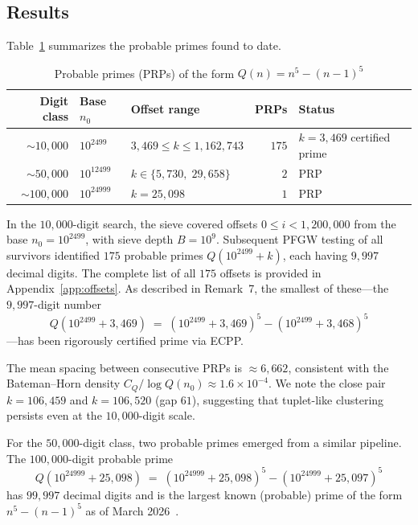 \documentclass[11pt,a4paper]{article}
\theoremstyle{plain}
\theoremstyle{definition}
\theoremstyle{remark}
\begin{document}
\subsection{Results}

Table~\ref{tab:largePRP} summarizes the probable primes found to date.

\begin{table}[ht]
\centering
\caption{Probable primes (PRPs) of the form $Q(n) = n^5 - (n-1)^5$}
\label{tab:largePRP}
\smallskip
\begin{tabular}{@{}rllrl@{}}
\toprule
Digit class & Base $n_0$ & Offset range & PRPs & Status \\
\midrule
$\sim 10{,}000$ & $10^{2499}$ & $3{,}469 \le k \le 1{,}162{,}743$ & $175$ & $k=3{,}469$ certified prime \\
$\sim 50{,}000$ & $10^{12499}$ & $k \in \{5{,}730,\; 29{,}658\}$ & $2$ & PRP \\
$\sim 100{,}000$ & $10^{24999}$ & $k = 25{,}098$ & $1$ & PRP \\
\bottomrule
\end{tabular}
\end{table}

In the $10{,}000$-digit search, the sieve covered offsets $0 \le i < 1{,}200{,}000$ from the base $n_0 = 10^{2499}$, with sieve depth $B = 10^9$. Subsequent PFGW testing of all survivors identified $175$ probable primes $Q(10^{2499}+k)$, each having $9{,}997$ decimal digits. The complete list of all $175$ offsets is provided in Appendix~\ref{app:offsets}. As described in Remark~7, the smallest of these---the $9{,}997$-digit number
\[
Q(10^{2499} + 3{,}469) \;=\; (10^{2499} + 3{,}469)^5 - (10^{2499} + 3{,}468)^5
\]
---has been rigorously certified prime via ECPP.

The mean spacing between consecutive PRPs is $\approx 6{,}662$, consistent with the Bateman--Horn density $C_Q / \!\log Q(n_0) \approx 1.6 \times 10^{-4}$. We note the close pair $k = 106{,}459$ and $k = 106{,}520$ (gap $61$), suggesting that tuplet-like clustering persists even at the $10{,}000$-digit scale.

For the $50{,}000$-digit class, two probable primes emerged from a similar pipeline. The $100{,}000$-digit probable prime
\[
Q(10^{24999} + 25{,}098) \;=\; (10^{24999} + 25{,}098)^5 - (10^{24999} + 25{,}097)^5
\]
has $99{,}997$ decimal digits and is the largest known (probable) prime of the form $n^5 - (n-1)^5$ as of March 2026~\cite{primepages}.


\end{document}
